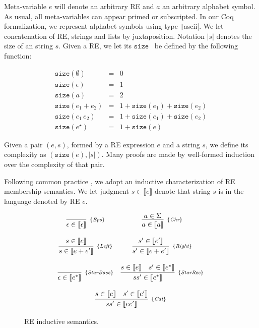 \documentclass[oneside,12pt]{scrbook}
\theoremstyle{definition}
\newcommand{\Eps}{\textit{Eps}}
\newcommand{\Chr}{\textit{Chr}}
\newcommand{\Catt}{\textit{Cat}}
\newcommand{\Left}{\textit{Left}}
\newcommand{\Right}{\textit{Right}}
\newcommand{\StarBase}{\textit{StarBase}}
\newcommand{\StarRec}{\textit{StarRec}}
\newcommand{\sembrackets}[1]{\ensuremath{\llbracket #1 \rrbracket}}
\newcommand{\size}{\ensuremath{\texttt{size}}}
\newcommand{\coq}[1]{\texttt|#1|}
\theoremstyle{plain}
\theoremstyle{definition}
\begin{document}
Meta-variable $e$ will denote an arbitrary RE and $a$ an
arbitrary alphabet symbol. As usual, all meta-variables can appear primed or subscripted.
In our Coq formalization, we represent alphabet symbols using type \coq{ascii}. We let concatenation
of RE, strings and lists by juxtaposition. Notation $|s|$
denotes the size of an string $s$. Given a RE, we let its \size~ be defined by the following 
function:


\[
\begin{array}{lcl}
\size(\emptyset) & = & 0 \\
\size(\epsilon)  & = & 1 \\
\size(a)         & = & 2 \\
\size(e_1 + e_2) & = & 1 + \size(e_1) + \size(e_2)\\
\size(e_1\,e_2)  & = & 1 + \size(e_1) + \size(e_2)\\
\size(e ^\star)  & = & 1 + \size(e)
\end{array}
\]

Given a pair $(e,s)$, formed by a RE expression $e$ and a string $s$, we define its complexity as
$(\size(e),|s|)$. Many proofs are made by well-formed induction over the complexity of that pair.

Following common practice \cite{Lopes2016,Ribeiro2017,Rathnayake2011}, we adopt an inductive
characterization of RE membership semantics. We let judgment $s \in \sembrackets{e}$ denote
that string $s$ is in the language denoted by RE $e$.

\begin{figure}[h]
	\[
	\begin{array}{cc}
	\infer[_{\{\Eps\}}]
	{\epsilon \in \sembrackets{\epsilon}}{} &
	\infer[_{\{\Chr\}}]
	{a \in \sembrackets{a}}{a \in \Sigma} \\ \\
	\infer[_{\{\Left\}}]
	{s \in \sembrackets{e + e'}}{s \in \sembrackets{e}} &
	\infer[_{\{\Right\}}]
	{s' \in \sembrackets{e + e'}}{s' \in \sembrackets{e'}} \\ \\
	\infer[_{\{\StarBase\}}]
	{\epsilon \in \sembrackets{e^\star}}{} &
	\infer[_{\{\StarRec\}}]
	{ss' \in \sembrackets{e^\star}}
	{s \in \sembrackets{e} & s' \in \sembrackets{e^\star}} \\ \\
	\multicolumn{2}{c}{
		\infer[_{\{\Catt\}}]
		{ss' \in \sembrackets{ee'}}
		{s \in \sembrackets{e} & s' \in \sembrackets{e'}}
	} \\
	\end{array}
	\]
	\centering
	\caption{RE inductive semantics.}
	\label{figure:resemantics}
\end{figure}
\end{document}
